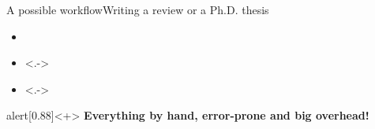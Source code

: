 \documentclass[usenames,svgnames,14pt]{beamer}
\begin{document}
\begin{frame}{A possible workflow}{Writing a review or a Ph.D. thesis}
\begin{overlayarea}{\textwidth}{0.5\textheight}
\begin{itemize}
\begin{onlyenv}
                      \begin{itemize}
                          \item Put a copy of the PDF file or of the compressed folder somewhere
                          \item Keep the sent email for later use
                      \end{itemize}
                  \end{onlyenv}
            \item<+-> 
            \item<.-> 
            \item<.-> 
        \end{itemize}
    \end{overlayarea}
    \begin{varblock}{alert}[0.88\textwidth]{}<+>
        \large\alert{\textbf{Everything by hand, error-prone and big overhead!}}
    \end{varblock}
\end{frame}
\end{document}
